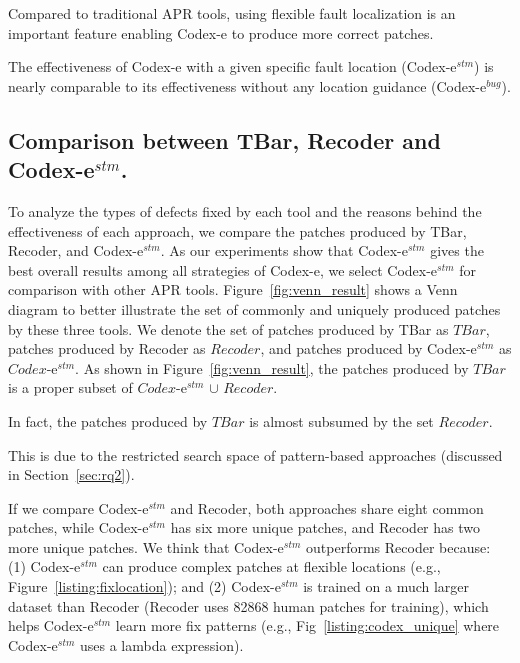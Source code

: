 Compared to traditional APR tools, using flexible fault localization is an important feature enabling Codex-e to produce more correct patches.

\begin{tcolorbox}[left=2pt,right=2pt,top=2pt,bottom=2pt]

The effectiveness of Codex-e with a given specific fault location (Codex-e$^{stm}$) is nearly comparable to its effectiveness without any location guidance (Codex-e$^{bug}$). 

\end{tcolorbox}

\subsection{Comparison between TBar, Recoder and Codex-e$^{stm}$.} To analyze the types of defects fixed by each tool and the reasons behind the effectiveness of each approach, we compare the patches produced by TBar, Recoder, and Codex-e$^{stm}$. As our experiments show that Codex-e$^{stm}$ gives the best overall results among all strategies of Codex-e, we select Codex-e$^{stm}$ for comparison with other APR tools. 
Figure~\ref{fig:venn_result} shows a Venn diagram to better illustrate the set of commonly and uniquely produced patches by these three tools. We denote the set of patches produced by TBar as $TBar$, patches produced by Recoder as $Recoder$, and patches produced by Codex-e$^{stm}$ as $Codex$-e$^{stm}$. As shown in Figure~\ref{fig:venn_result}, the patches produced by $TBar$ is a proper subset of $Codex$-e$^{stm}$ $\cup$ $Recoder$. 

In fact, the patches produced by $TBar$ is almost subsumed by the set $Recoder$.

This is due to the restricted search space of pattern-based approaches (discussed in Section~\ref{sec:rq2}).

If we compare Codex-e$^{stm}$ and Recoder, both approaches share eight common patches, while Codex-e$^{stm}$ has six more unique patches, and Recoder has two more unique patches. We think that Codex-e$^{stm}$ outperforms Recoder because: (1) Codex-e$^{stm}$ can produce complex patches at flexible locations (e.g., Figure~\ref{listing:fixlocation}); and (2) Codex-e$^{stm}$ is trained on a much larger dataset than Recoder (Recoder uses 82868 human patches for training), which helps Codex-e$^{stm}$ learn more fix patterns (e.g.,  Fig~\ref{listing:codex_unique} where Codex-e$^{stm}$ uses a lambda expression). 

